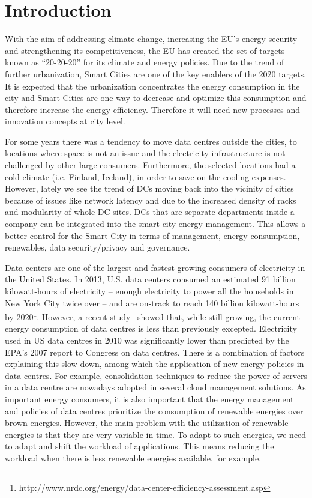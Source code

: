 \section{Introduction}
\label{sec: intro}
With the aim of addressing climate change, increasing the EU’s energy security and strengthening its competitiveness, the EU has created the set of targets known as “20-20-20” for its climate and energy policies. Due to the trend of further urbanization, Smart Cities are one of the key enablers of the 2020 targets. It is expected that the urbanization concentrates the energy consumption in the city and Smart Cities are one way to decrease and optimize this consumption and therefore increase the energy efficiency. Therefore it will need new processes and innovation concepts at city level.

For some years there was a tendency to move data centres outside the cities, to locations where space is not an issue and the electricity infrastructure is not challenged by other large consumers. Furthermore, the selected locations had a cold climate (i.e. Finland, Iceland), in order to save on the cooling expenses. However, lately we see the trend of DCs moving back into the vicinity of cities because of issues like network latency and due to the increased density of racks and modularity of whole DC sites. DCs that are separate departments inside a company can be integrated into the smart city energy management. This allows a better control for the Smart City in terms of management, energy consumption, renewables, data security/privacy and governance.

Data centers are one of the largest and fastest growing consumers of electricity in the United States. In 2013, U.S. data centers consumed an estimated 91 billion kilowatt-hours of electricity -- enough electricity to power all the households in New York City twice over -- and are on-track to reach 140 billion kilowatt-hours by 2020\footnote{http://www.nrdc.org/energy/data-center-efficiency-assessment.asp}.
However, a recent study~\cite{koomey2011} showed that, while still growing, the current energy consumption of data centres is less than previously excepted.
Electricity used in US data centres in 2010 was significantly lower than predicted by the EPA’s 2007 report to Congress on data centres.
There is a combination of factors explaining this slow down, among which the application of new energy policies in data centres.
For example, consolidation techniques to reduce the power of servers in a data centre are nowadays adopted in several cloud management solutions.
As important energy consumers, it is also important that the energy management and policies of data centres prioritize the consumption of renewable energies over brown energies.
However, the main problem with the utilization of renewable energies is that they are very variable in time.
To adapt to such energies, we need to adapt and shift the workload of applications.
This means reducing the workload when there is less renewable energies available, for example.

